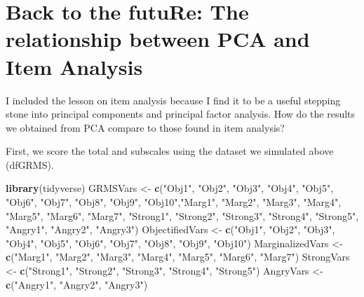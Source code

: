 \documentclass[
  english,
]{book}
\newenvironment{Shaded}{\begin{snugshade}}{\end{snugshade}}
\newcommand{\KeywordTok}[1]{\textcolor[rgb]{0.13,0.29,0.53}{\textbf{#1}}}
\newcommand{\NormalTok}[1]{#1}
\newcommand{\StringTok}[1]{\textcolor[rgb]{0.31,0.60,0.02}{#1}}
\begin{document}
\hypertarget{back-to-the-future-the-relationship-between-pca-and-item-analysis}{%
\section{Back to the futuRe: The relationship between PCA and Item Analysis}\label{back-to-the-future-the-relationship-between-pca-and-item-analysis}}

I included the lesson on item analysis because I find it to be a useful stepping stone into principal components and principal factor analysis. How do the results we obtained from PCA compare to those found in item analysis?

First, we score the total and subscales using the dataset we simulated above (dfGRMS).

\begin{Shaded}
\begin{Highlighting}[]
\KeywordTok{library}\NormalTok{(tidyverse)}
\NormalTok{GRMSVars <-}\StringTok{ }\KeywordTok{c}\NormalTok{(}\StringTok{"Obj1"}\NormalTok{, }\StringTok{"Obj2"}\NormalTok{, }\StringTok{"Obj3"}\NormalTok{, }\StringTok{"Obj4"}\NormalTok{, }\StringTok{"Obj5"}\NormalTok{, }\StringTok{"Obj6"}\NormalTok{, }\StringTok{"Obj7"}\NormalTok{, }\StringTok{"Obj8"}\NormalTok{, }\StringTok{"Obj9"}\NormalTok{, }\StringTok{"Obj10"}\NormalTok{,}\StringTok{"Marg1"}\NormalTok{, }\StringTok{"Marg2"}\NormalTok{, }\StringTok{"Marg3"}\NormalTok{, }\StringTok{"Marg4"}\NormalTok{, }\StringTok{"Marg5"}\NormalTok{, }\StringTok{"Marg6"}\NormalTok{, }\StringTok{"Marg7"}\NormalTok{, }\StringTok{"Strong1"}\NormalTok{, }\StringTok{"Strong2"}\NormalTok{, }\StringTok{"Strong3"}\NormalTok{, }\StringTok{"Strong4"}\NormalTok{, }\StringTok{"Strong5"}\NormalTok{, }\StringTok{"Angry1"}\NormalTok{, }\StringTok{"Angry2"}\NormalTok{, }\StringTok{"Angry3"}\NormalTok{)}
\NormalTok{ObjectifiedVars <-}\StringTok{ }\KeywordTok{c}\NormalTok{(}\StringTok{"Obj1"}\NormalTok{, }\StringTok{"Obj2"}\NormalTok{, }\StringTok{"Obj3"}\NormalTok{, }\StringTok{"Obj4"}\NormalTok{, }\StringTok{"Obj5"}\NormalTok{, }\StringTok{"Obj6"}\NormalTok{, }\StringTok{"Obj7"}\NormalTok{, }\StringTok{"Obj8"}\NormalTok{, }\StringTok{"Obj9"}\NormalTok{, }\StringTok{"Obj10"}\NormalTok{)}
\NormalTok{MarginalizedVars <-}\StringTok{ }\KeywordTok{c}\NormalTok{(}\StringTok{"Marg1"}\NormalTok{, }\StringTok{"Marg2"}\NormalTok{, }\StringTok{"Marg3"}\NormalTok{, }\StringTok{"Marg4"}\NormalTok{, }\StringTok{"Marg5"}\NormalTok{, }\StringTok{"Marg6"}\NormalTok{, }\StringTok{"Marg7"}\NormalTok{)}
\NormalTok{StrongVars <-}\StringTok{ }\KeywordTok{c}\NormalTok{(}\StringTok{"Strong1"}\NormalTok{, }\StringTok{"Strong2"}\NormalTok{, }\StringTok{"Strong3"}\NormalTok{, }\StringTok{"Strong4"}\NormalTok{, }\StringTok{"Strong5"}\NormalTok{)}
\NormalTok{AngryVars <-}\StringTok{ }\KeywordTok{c}\NormalTok{(}\StringTok{"Angry1"}\NormalTok{, }\StringTok{"Angry2"}\NormalTok{, }\StringTok{"Angry3"}\NormalTok{)}


\end{Highlighting}
\end{Shaded}
\end{document}
